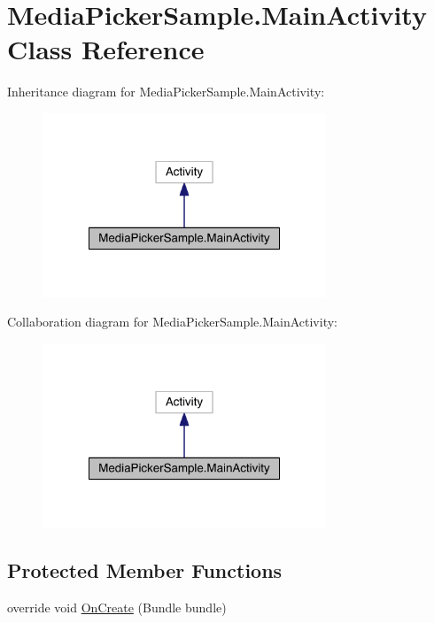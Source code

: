 \hypertarget{class_media_picker_sample_1_1_main_activity}{\section{Media\+Picker\+Sample.\+Main\+Activity Class Reference}
\label{class_media_picker_sample_1_1_main_activity}
}


Inheritance diagram for Media\+Picker\+Sample.\+Main\+Activity\+:
\nopagebreak
\begin{figure}[H]
\begin{center}
\leavevmode
\includegraphics[width=240pt]{class_media_picker_sample_1_1_main_activity__inherit__graph}
\end{center}
\end{figure}


Collaboration diagram for Media\+Picker\+Sample.\+Main\+Activity\+:
\nopagebreak
\begin{figure}[H]
\begin{center}
\leavevmode
\includegraphics[width=240pt]{class_media_picker_sample_1_1_main_activity__coll__graph}
\end{center}
\end{figure}
\subsection*{Protected Member Functions}
\begin{DoxyCompactItemize}
\item 
override void \hyperlink{class_media_picker_sample_1_1_main_activity_a12c4f923e0c9794396365f98208b82e7}{On\+Create} (Bundle bundle)
\end{DoxyCompactItemize}


